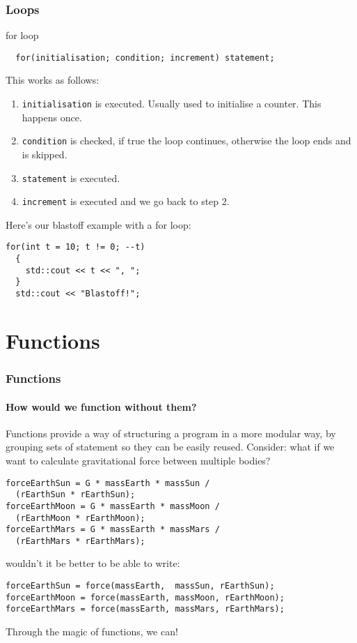 \documentclass{beamer}
\begin{document}
\begin{frame}[fragile]
  \frametitle{Loops}
  
  \begin{block}{for loop}
    \begin{lstlisting}
  for(initialisation; condition; increment) statement;
    \end{lstlisting}
    This works as follows:
    \begin{enumerate}
      \item<2->{\texttt{initialisation} is executed.  Usually used to initialise a counter.  This happens once.}
      \item<3->{\texttt{condition} is checked, if true the loop continues, otherwise the loop ends and is skipped.}
      \item<4->{\texttt{statement} is executed.}
      \item<5->{\texttt{increment} is executed and we go back to step 2.}
    \end{enumerate}
    \pause[6]
    Here's our blastoff example with a for loop:
    \begin{lstlisting}[belowskip=0pt]
  for(int t = 10; t != 0; --t)
  {
    std::cout << t << ", ";
  }
  std::cout << "Blastoff!";
    \end{lstlisting}
    
  \end{block}
\end{frame}

\section{Functions}

\begin{frame}[fragile]
  \frametitle{Functions}
  \framesubtitle{How would we function without them?}
  Functions provide a way of structuring a program in a more modular way, by grouping sets of statement so they can be easily reused.\newline
  \pause
  Consider: what if we want to calculate gravitational force between multiple bodies?
  \begin{lstlisting}
forceEarthSun = G * massEarth * massSun /
  (rEarthSun * rEarthSun);
forceEarthMoon = G * massEarth * massMoon /
  (rEarthMoon * rEarthMoon);
forceEarthMars = G * massEarth * massMars /
  (rEarthMars * rEarthMars);
  \end{lstlisting}
  \pause
  wouldn't it be better to be able to write:
  \begin{lstlisting}
forceEarthSun = force(massEarth,  massSun, rEarthSun);
forceEarthMoon = force(massEarth, massMoon, rEarthMoon);
forceEarthMars = force(massEarth, massMars, rEarthMars);
  \end{lstlisting}
  Through the magic of functions, we can!
\end{frame}
\end{document}
